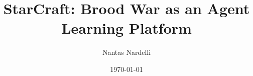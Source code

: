 \documentclass[bsc, twoside, parskip, abbrevs, notimes, normalheadings,
singlespacing, deptreport]{styles/infthesis}
\title{StarCraft: Brood War as an Agent Learning Platform}
\author{Nantas Nardelli}
\date{\today}
\begin{document}
\begin{preliminary}
  \maketitle
  
  
  
  \standarddeclaration
  
  \dedication{}
  
  \tableofcontents

\end{preliminary}




\end{document}
